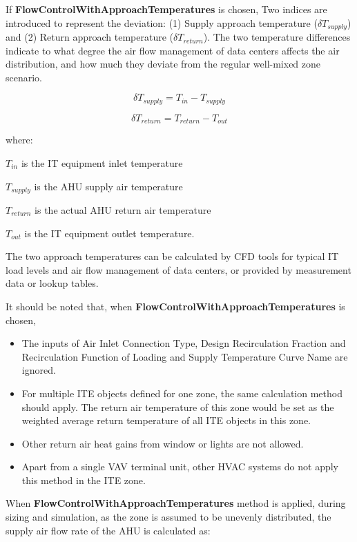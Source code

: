 If \textbf{FlowControlWithApproachTemperatures} is chosen, Two indices are introduced to represent the deviation: (1) Supply approach temperature ($\delta T_{supply}$) and (2) Return approach temperature ($\delta T_{return}$). The two temperature differences indicate to what degree the air flow management of data centers affects the air distribution, and how much they deviate from the regular well-mixed zone scenario.

\begin{equation}
\delta T_{supply}=T_{in}-T_{supply}
\end{equation}

\begin{equation}
\delta T_{return}=T_{return}-T_{out}
\end{equation}

where:

$T_{in}$ is the IT equipment inlet temperature

$T_{supply}$ is the AHU supply air temperature

$T_{return}$ is the actual AHU return air temperature

$T_{out}$ is the IT equipment outlet temperature.

The two approach temperatures can be calculated by CFD tools for typical IT load levels and air flow management of data centers, or provided by measurement data or lookup tables. 

It should be noted that, when \textbf{FlowControlWithApproachTemperatures} is chosen, 

\begin{itemize}
\item The inputs of Air Inlet Connection Type, Design Recirculation Fraction and Recirculation Function of Loading and Supply Temperature Curve Name are ignored.
\item For multiple ITE objects defined for one zone, the same calculation method should apply. The return air temperature of this zone would be set as the weighted average return temperature of all ITE objects in this zone.
\item Other return air heat gains from window or lights are not allowed.
\item Apart from a single VAV terminal unit, other HVAC systems do not apply this method in the ITE zone.
\end{itemize}

When \textbf{FlowControlWithApproachTemperatures} method is applied, during sizing and simulation, as the zone is assumed to be unevenly distributed, the supply air flow rate of the AHU is calculated as:

